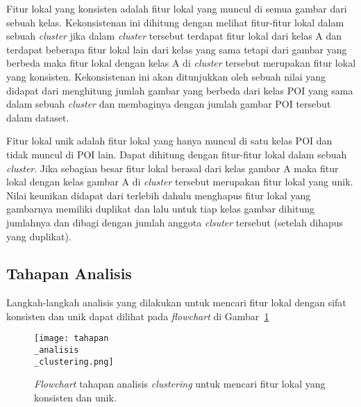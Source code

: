 Fitur lokal yang konsisten adalah fitur lokal yang muncul di semua gambar dari sebuah kelas. Kekonsistenan ini dihitung dengan melihat fitur-fitur lokal dalam sebuah \textit{cluster} jika dalam \textit{cluster} tersebut terdapat fitur lokal dari kelas A dan terdapat beberapa fitur lokal lain dari kelas yang sama tetapi dari gambar yang berbeda maka fitur lokal dengan kelas A di \textit{cluster} tersebut merupakan fitur lokal yang konsisten. Kekonsistenan ini akan ditunjukkan oleh sebuah nilai yang didapat dari menghitung jumlah gambar yang berbeda dari kelas POI yang sama dalam sebuah \textit{cluster} dan membaginya dengan jumlah gambar POI tersebut dalam dataset.

Fitur lokal unik adalah fitur lokal yang hanya muncul di satu kelas POI dan tidak muncul di POI lain. Dapat dihitung dengan fitur-fitur lokal dalam sebuah \textit{cluster}. Jika sebagian besar fitur lokal berasal dari kelas gambar A maka fitur lokal dengan kelas gambar A di \textit{cluster} tersebut merupakan fitur lokal yang unik.  Nilai keunikan didapat dari terlebih dahulu menghapus fitur lokal yang gambarnya memiliki duplikat dan lalu untuk tiap kelas gambar dihitung jumlahnya dan dibagi dengan jumlah anggota \textit{clsuter} tersebut (setelah dihapus yang duplikat).

\subsection{Tahapan Analisis}
\label{subsec:tahapan_analisis_clustering}
Langkah-langkah analisis yang dilakukan untuk mencari fitur lokal dengan sifat konsisten dan unik dapat dilihat pada \textit{flowchart} di Gambar~\ref{fig:tahapan_analisis_clustering}
\begin{figure}[H]
	\centering
	\texttt{[image: tahapan\\\_analisis\\\_clustering.png]}
	\caption{\textit{Flowchart} tahapan analisis \textit{clustering} untuk mencari fitur lokal yang konsisten dan unik.}
	\label{fig:tahapan_analisis_clustering}
\end{figure}

